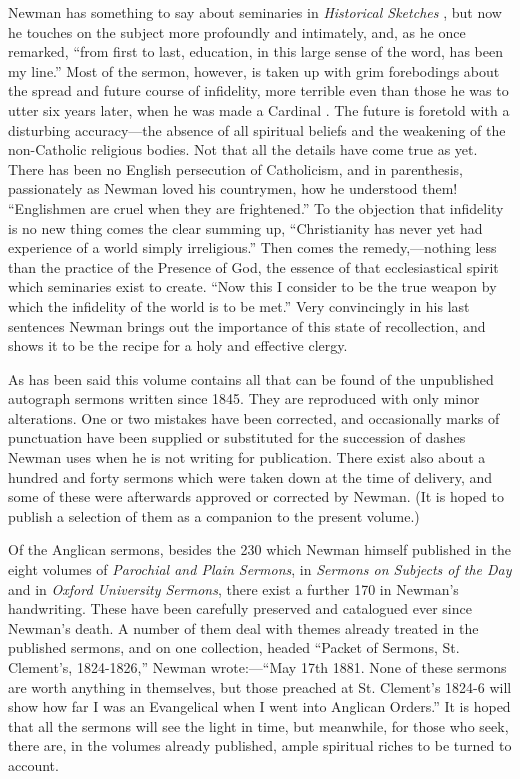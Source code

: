Newman has something to say about seminaries in \emph{Historical
Sketches} , but now he
touches on the subject more profoundly and intimately, and, as he once
remarked, ``from first to last, education, in this large sense of
the word, has been my line.'' 
Most of the sermon, however, is taken up with grim forebodings about
the spread and future course of infidelity, more terrible even than
those he was to utter six years later, when he was made a Cardinal . The future is foretold with a disturbing accuracy—the
absence of all spiritual beliefs and the weakening of the non-Catholic
religious bodies. Not that all the details have come true as yet.
There has been no English persecution of Catholicism, and in
parenthesis, passionately as Newman loved his countrymen, how he
understood them! ``Englishmen are cruel when they are frightened.''
To the objection that infidelity is no new thing comes the clear
summing up, ``Christianity has never yet had experience of a world
simply irreligious.'' Then comes the remedy,—nothing less than the
practice of the Presence of God, the essence of that ecclesiastical
spirit which seminaries exist to create. ``Now this I consider to
be the true weapon by which the infidelity of the world is to be met.''
Very convincingly in his last sentences Newman brings out the
importance of this state of recollection, and shows it to be the
recipe for a holy and effective clergy.


As has been said this volume contains all that
can be found of the unpublished autograph sermons written since 1845.
They are reproduced with only minor alterations. One or two mistakes
have been corrected, and occasionally marks of punctuation have been
supplied or substituted for the succession of dashes Newman uses when
he is not writing for publication. There exist also about a hundred
and forty sermons which were taken down at the time of delivery, and
some of these were afterwards approved or corrected by Newman. (It is
hoped to publish a selection of them as a companion to the
present volume.)


Of the Anglican sermons, besides the 230 which
Newman himself published in the eight volumes of \emph{Parochial and
Plain Sermons}, in \emph{Sermons on Subjects of the Day} and in \emph{Oxford
University Sermons}, there exist a further 170 in Newman's
handwriting. These have been carefully preserved and catalogued ever
since Newman's death. A number of them deal with themes already
treated in the published sermons, and on one collection, headed
``Packet of Sermons, St. Clement's, 1824-1826,'' Newman
wrote:—``May 17th 1881. None of these sermons are worth anything
in themselves, but those preached at St. Clement's 1824-6 will show
how far I was an Evangelical when I went into Anglican Orders.'' It is
hoped that all the sermons will see the light in time, but meanwhile,
for those who seek, there are, in the volumes already published, ample
spiritual riches to be turned to account.


